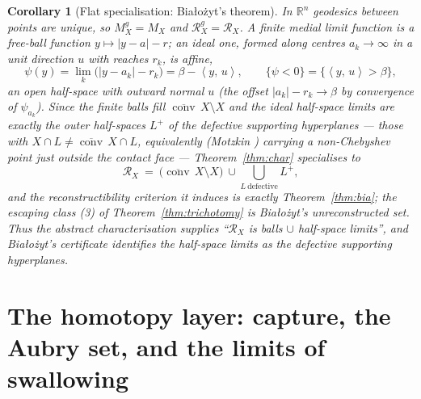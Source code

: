 \documentclass[11pt]{article}
\newtheorem{corollary}[theorem]{Corollary}
\theoremstyle{remark}
\newcommand{\R}{\mathbb{R}}
\newcommand{\X}{X}
\newcommand{\Mx}{M_{\X}}
\newcommand{\Mg}{M^{g}_{\X}}
\newcommand{\Rx}{\mathcal{R}_{\X}}
\newcommand{\Rg}{\mathcal{R}^{g}_{\X}}
\newcommand{\conv}{\operatorname{conv}}
\newcommand{\sca}[2]{\left\langle #1,\, #2\right\rangle}
\begin{document}
\begin{corollary}[Flat specialisation: Bia\l{}o\.zyt's theorem]
\label{cor:flat}
In $\R^{n}$ geodesics between points are unique, so $\Mg=\Mx$ and
$\Rg=\Rx$. A finite medial limit function is a free-ball function
$y\mapsto|y-a|-r$; an ideal one, formed along centres
$a_{k}\to\infty$ in a unit direction $u$ with reaches $r_{k}$, is
\emph{affine},
\[
  \psi(y)=\lim_{k}\bigl(|y-a_{k}|-r_{k}\bigr)=\beta-\sca{y}{u},
  \qquad \{\psi<0\}=\{\sca{y}{u}>\beta\},
\]
an open half-space with outward normal $u$ (the offset
$|a_{k}|-r_{k}\to\beta$ by convergence of $\psi_{a_{k}}$). Since the
finite balls fill $\overline{\conv}\,\X\setminus\X$ and the ideal
half-space limits are exactly the outer half-spaces $L^{+}$ of the
\emph{defective} supporting hyperplanes --- those with
$\X\cap L\neq\overline{\conv}\,\X\cap L$, equivalently (Motzkin
\cite{Mot}) carrying a non-Chebyshev point just outside the contact
face \cite{Bia} --- Theorem~\ref{thm:char} specialises to
\[
  \Rx\ =\ \bigl(\overline{\conv}\,\X\setminus\X\bigr)\ \cup\!\!
  \bigcup_{L\ \mathrm{defective}}\!\!L^{+},
\]
and the reconstructibility criterion it induces is exactly
Theorem~\ref{thm:bia}; the escaping class \textup{(3)} of
Theorem~\ref{thm:trichotomy} is Bia\l{}o\.zyt's unreconstructed set.
Thus the abstract characterisation supplies ``$\Rx$ is balls
$\cup$ half-space limits'', and Bia\l{}o\.zyt's certificate identifies
the half-space limits as the defective supporting hyperplanes.
\end{corollary}

\section{The homotopy layer: capture, the Aubry set, and the limits
of swallowing}\label{sec:homotopy}
\end{document}
